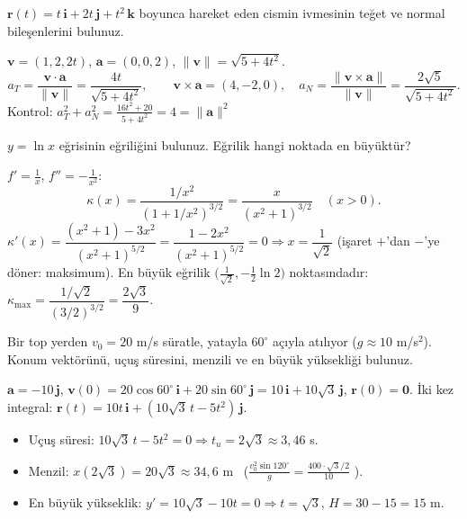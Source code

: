 \begin{soru}
$\mathbf r(t)=t\,\mathbf i+2t\,\mathbf j+t^2\,\mathbf k$ boyunca hareket eden cismin ivmesinin teğet ve normal bileşenlerini bulunuz.
\end{soru}
\begin{cevap}
$\mathbf v=(1,2,2t)$, $\mathbf a=(0,0,2)$, $\|\mathbf v\|=\sqrt{5+4t^2}$.
\[ a_T=\frac{\mathbf v\cdot\mathbf a}{\|\mathbf v\|}=\frac{4t}{\sqrt{5+4t^2}},\qquad
\mathbf v\times\mathbf a=(4,-2,0),\quad a_N=\frac{\|\mathbf v\times\mathbf a\|}{\|\mathbf v\|}=\frac{2\sqrt5}{\sqrt{5+4t^2}} . \]
Kontrol: $a_T^2+a_N^2=\frac{16t^2+20}{5+4t^2}=4=\|\mathbf a\|^2$ \checkmark
\end{cevap}

\begin{soru}
$y=\ln x$ eğrisinin eğriliğini bulunuz. Eğrilik hangi noktada en büyüktür?
\end{soru}
\begin{cevap}
$f'=\frac1x$, $f''=-\frac1{x^2}$:
\[ \kappa(x)=\frac{1/x^2}{(1+1/x^2)^{3/2}}=\frac{x}{(x^2+1)^{3/2}}\quad(x>0). \]
$\kappa'(x)=\dfrac{(x^2+1)-3x^2}{(x^2+1)^{5/2}}=\dfrac{1-2x^2}{(x^2+1)^{5/2}}=0\Rightarrow x=\dfrac1{\sqrt2}$ (işaret $+$'dan $-$'ye döner: maksimum).
En büyük eğrilik $\big(\frac1{\sqrt2},-\frac12\ln2\big)$ noktasındadır: $\kappa_{\max}=\dfrac{1/\sqrt2}{(3/2)^{3/2}}=\dfrac{2\sqrt3}{9}$.
\end{cevap}

\begin{soru}
Bir top yerden $v_0=20$ m/s süratle, yatayla $60^\circ$ açıyla atılıyor ($g\approx10$ m/s$^2$). Konum vektörünü, uçuş süresini, menzili ve
en büyük yüksekliği bulunuz.
\end{soru}
\begin{cevap}
$\mathbf a=-10\,\mathbf j$, $\mathbf v(0)=20\cos60^\circ\,\mathbf i+20\sin60^\circ\,\mathbf j=10\,\mathbf i+10\sqrt3\,\mathbf j$, $\mathbf r(0)=\mathbf 0$.
İki kez integral: $\mathbf r(t)=10t\,\mathbf i+(10\sqrt3\,t-5t^2)\,\mathbf j$.
\begin{itemize}
\item Uçuş süresi: $10\sqrt3\,t-5t^2=0\Rightarrow t_u=2\sqrt3\approx3{,}46$ s.
\item Menzil: $x(2\sqrt3)=20\sqrt3\approx34{,}6$ m \ ($\frac{v_0^2\sin120^\circ}{g}=\frac{400\cdot\sqrt3/2}{10}$ \checkmark).
\item En büyük yükseklik: $y'=10\sqrt3-10t=0\Rightarrow t=\sqrt3$, $H=30-15=15$ m.
\end{itemize}
\end{cevap}
